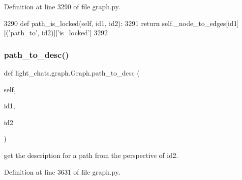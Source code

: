 Definition at line 3290 of file graph.\+py.


\begin{DoxyCode}
3290     \textcolor{keyword}{def }path\_is\_locked(self, id1, id2):
3291         \textcolor{keywordflow}{return} self.\_node\_to\_edges[id1][(\textcolor{stringliteral}{'path\_to'}, id2)][\textcolor{stringliteral}{'is\_locked'}]
3292 
\end{DoxyCode}
\mbox{\label{classlight__chats_1_1graph_1_1Graph_afd47e9b4f058dc2cbb520164db920664}} 
\subsubsection{\texorpdfstring{path\+\_\+to\+\_\+desc()}{path\_to\_desc()}}
{\footnotesize\ttfamily def light\+\_\+chats.\+graph.\+Graph.\+path\+\_\+to\+\_\+desc (\begin{DoxyParamCaption}\item[{}]{self,  }\item[{}]{id1,  }\item[{}]{id2 }\end{DoxyParamCaption})}

\begin{DoxyVerb}get the description for a path from the perspective of id2.
\end{DoxyVerb}
 

Definition at line 3631 of file graph.\+py.


